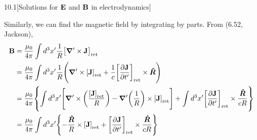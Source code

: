 \documentclass[12pt]{article}
\newcommand{\ret}[1]{\qty[#1]_\text{ret}}
\newcommand{\Rhat}{\bm{\hat{R}}}
\begin{document}
\begin{problem}{10.1}[Solutions for $\vb{E}$ and $\vb{B}$ in electrodynamics]
\begin{solution}
Similarly, we can find the magnetic field by integrating by parts. From (6.52,
Jackson),
\begin{align}
    \vb{B}
    &=\frac{\mu_0}{4\pi}\int d^3x'\frac1R\ret{\grad'\times\vb{J}}\notag\\
    &=\frac{\mu_0}{4\pi}\int d^3x'\frac1R\qty(
    \grad'\times\ret{\vb{J}}+\frac1c\ret{\frac{\partial\vb{J}}{\partial
    t'}}\times\Rhat
    )\notag\\
    &=\frac{\mu_0}{4\pi}\qty{
        \int
        d^3x'\qty[\grad'\times\qty(\frac{\ret{\vb{J}}}{R})-\grad'\qty(\frac1R)\times\ret{\vb{J}}]
        +\int d^3x'\ret{\frac{\partial\vb{J}}{\partial t'}}\times\frac{\Rhat}{cR}
    }\notag\\
    &=\frac{\mu_0}{4\pi}\int d^3x'\qty{-\frac{\Rhat}{R}\times\ret{\vb{J}}
    +\ret{\frac{\partial\vb{J}}{\partial t'}}\times\frac{\Rhat}{cR}}
\end{align}
\end{solution}
\end{problem}
\end{document}
